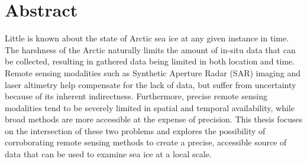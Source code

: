 
\chapter*{Abstract}

\indent Little is known about the state of Arctic sea ice at any given instance in time. The harshness of the Arctic naturally limits the amount of in-situ data that can be collected, resulting in gathered data being limited in both location and time. Remote sensing modalities such as Synthetic Aperture Radar (SAR) imaging and laser altimetry help compensate for the lack of data, but suffer from uncertainty because of its inherent indirectness. Furthermore, precise remote sensing modalities tend to be severely limited in spatial and temporal availability, while broad methods are more accessible at the expense of precision. This thesis focuses on the intersection of these two problems and explores the possibility of corroborating remote sensing methods to create a precise, accessible source of data that can be used to examine sea ice at a local scale.
\par

